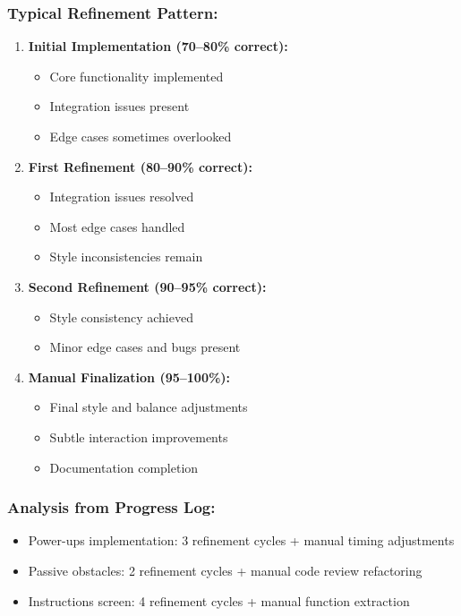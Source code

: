 \documentclass[12pt,a4paper]{article}
\begin{document}
\subsubsection*{Typical Refinement Pattern:}
\begin{enumerate}
    \item \textbf{Initial Implementation (70--80\% correct):}
    \begin{itemize}
        \item Core functionality implemented
        \item Integration issues present
        \item Edge cases sometimes overlooked
    \end{itemize}
    
    \item \textbf{First Refinement (80--90\% correct):}
    \begin{itemize}
        \item Integration issues resolved
        \item Most edge cases handled
        \item Style inconsistencies remain
    \end{itemize}
    
    \item \textbf{Second Refinement (90--95\% correct):}
    \begin{itemize}
        \item Style consistency achieved
        \item Minor edge cases and bugs present
    \end{itemize}
    
    \item \textbf{Manual Finalization (95--100\%):}
    \begin{itemize}
        \item Final style and balance adjustments
        \item Subtle interaction improvements
        \item Documentation completion
    \end{itemize}
\end{enumerate}

\subsubsection*{Analysis from Progress Log:}
\begin{itemize}
    \item Power-ups implementation: 3 refinement cycles + manual timing adjustments
    \item Passive obstacles: 2 refinement cycles + manual code review refactoring
    \item Instructions screen: 4 refinement cycles + manual function extraction
\end{itemize}
\end{document}
